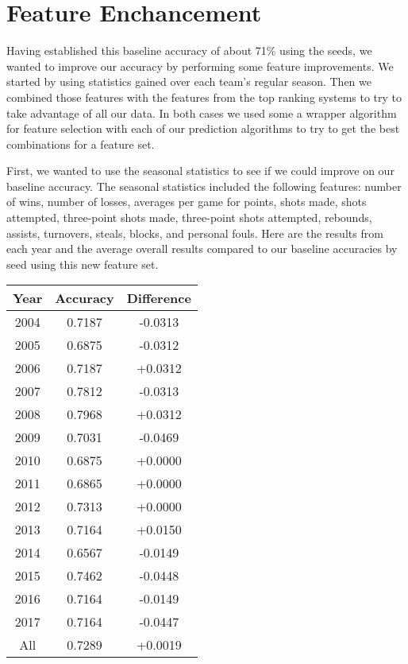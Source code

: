 \section{Feature Enchancement}

Having established this baseline accuracy of about 71\% using the seeds, we wanted to improve our accuracy by performing some feature improvements. 
We started by using statistics gained over each team’s regular season. 
Then we combined those features with the features from the top ranking systems to try to take advantage of all our data. 
In both cases we used some a wrapper algorithm for feature selection with each of our prediction algorithms to try to get the best combinations for a feature set.

First, we wanted to use the seasonal statistics to see if we could improve on our baseline accuracy.
The seasonal statistics included the following features: number of wins, number of losses, averages per game for points, shots made, shots attempted, three-point shots made, three-point shots attempted, rebounds, assists, turnovers, steals, blocks, and personal fouls.
Here are the results from each year and the average overall results compared to our baseline accuracies by seed using this new feature set. 

\vspace{0.5cm}
\begin{tabular}{c c c}
    \toprule
    Year & Accuracy & Difference\\
    \midrule
    2004 & 0.7187 & -0.0313\\
    2005 & 0.6875 & -0.0312\\
    2006 & 0.7187 & +0.0312\\
    2007 & 0.7812 & -0.0313\\
    2008 & 0.7968 & +0.0312\\
    2009 & 0.7031 & -0.0469\\
    2010 & 0.6875 & +0.0000\\
    2011 & 0.6865 & +0.0000\\
    2012 & 0.7313 & +0.0000\\
    2013 & 0.7164 & +0.0150\\
    2014 & 0.6567 & -0.0149\\
    2015 & 0.7462 & -0.0448\\
    2016 & 0.7164 & -0.0149\\
    2017 & 0.7164 & -0.0447\\
    All & 0.7289 & +0.0019\\
    \bottomrule
\end{tabular}
\vspace{0.5cm}

